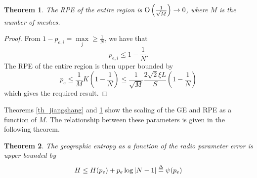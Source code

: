 \documentclass[conference]{IEEEtran}
\newtheorem{Theo}{Theorem}
\begin{document}
\begin{Theo}\label{TH_pe_upper}
The RPE of the entire region is ${{\rm O}}\left( {\frac{1}{{\sqrt M }}} \right) \to 0$, where $M$ is the number of meshes.
\end{Theo}
\begin{proof}
From $1 - {p_{e,i}} = \mathop {\max {p_{ij}}}\limits_j  \ge \frac{1}{N}$, we have that
\begin{equation}\label{eq_pei_upper_bound}
{p_{e,i}} \le 1 - \frac{1}{N}.
\end{equation}
The RPE of the entire region is then upper bounded by
\begin{equation}\label{eq_RPE_upper_bound}
{p_e} \le \frac{1}{M}K\left( {1 - \frac{1}{N}} \right) \le \frac{1}{{\sqrt M }}\frac{{2\sqrt 2 \xi L}}{S}\left( {1 - \frac{1}{N}} \right)
\end{equation}
which gives the required result.
\end{proof}

Theorems \ref{th_jiangshang} and \ref{TH_pe_upper} show the scaling of the GE and RPE as a function of $M$.
The relationship between these parameters is given in the following theorem.
\begin{Theo}\label{th_relation}
The geographic entropy as a function of the radio parameter error is upper bounded by
\begin{equation}\label{origion}
H \le H(p_e) + {p_e}\log \left| {N - 1} \right| \buildrel \Delta \over = \psi ({p_e})
\end{equation}
\end{Theo}
\end{document}
